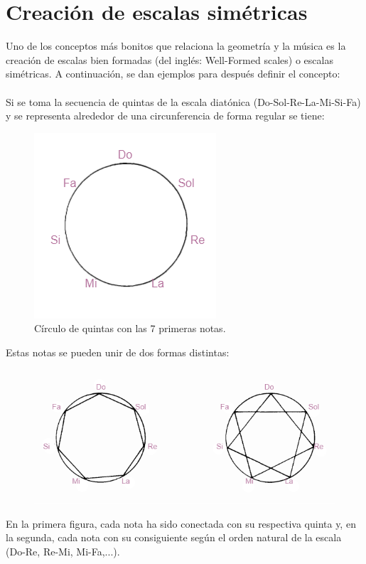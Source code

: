 \documentclass[a4paper, openright, 11pt, titlepage]{report}
\theoremstyle{definition}\newtheorem{defin}[propo]{Definition}
\theoremstyle{definition}\newtheorem{obser}[propo]{Remark}
\theoremstyle{definition}\newtheorem{ejem}[propo]{Ejemplo}
\theoremstyle{definition}\newtheorem{algoritmo}[propo]{Algoritmo}
\begin{document}
\section{Creación de escalas simétricas}
Uno de los conceptos más bonitos que relaciona la geometría y la música es la creación de escalas bien formadas (del inglés: Well-Formed scales) o escalas simétricas. A continuación, se dan ejemplos para después definir el concepto:\\\\
Si se toma la secuencia de quintas de la escala diatónica (Do-Sol-Re-La-Mi-Si-Fa) y se representa alrededor de una circunferencia de forma regular se tiene: 
\begin{figure}[H]
    \centering
    \includegraphics[scale = 0.7]{circuloQuintas.png}
    \caption{Círculo de quintas con las 7 primeras notas.}
\end{figure}
Estas notas se pueden unir de dos formas distintas:
\begin{figure}[H]
    \centering
    \includegraphics[scale = 0.7]{diatonicaSimetrica.png}
\end{figure}
En la primera figura, cada nota ha sido conectada con su respectiva quinta y, en la segunda, cada nota con su consiguiente según el orden natural de la escala (Do-Re, Re-Mi, Mi-Fa,...).\\\\
\end{document}
